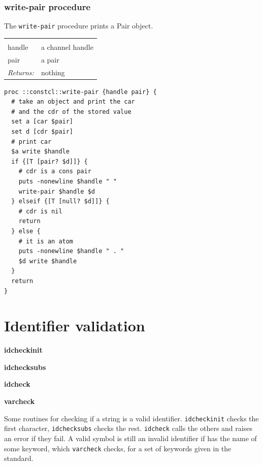 \documentclass[twoside,9pt]{report}
\begin{document}
\subsection{write-pair procedure}
\label{write-pair-procedure}


The \texttt{write-pair} procedure prints a Pair object.

\noindent\begin{tabular}{ |p{1.9cm} p{8cm}| }
\hline
\rowcolor[HTML]{CCCCCC} \multicolumn{2}{|l|}{\bf write-pair (internal)} \\
handle & a channel handle \\
pair & a pair \\
\textit{Returns:} & nothing \\
\hline
\end{tabular}
\begin{lstlisting}
proc ::constcl::write-pair {handle pair} {
  # take an object and print the car
  # and the cdr of the stored value
  set a [car $pair]
  set d [cdr $pair]
  # print car
  $a write $handle
  if {[T [pair? $d]]} {
    # cdr is a cons pair
    puts -nonewline $handle " "
    write-pair $handle $d
  } elseif {[T [null? $d]]} {
    # cdr is nil
    return
  } else {
    # it is an atom
    puts -nonewline $handle " . "
    $d write $handle
  }
  return
}
\end{lstlisting}
\chapter{Identifier validation}
\label{identifier-validation}


\textbf{idcheckinit}


\textbf{idchecksubs}


\textbf{idcheck}


\textbf{varcheck}


Some routines for checking if a string is a valid identifier. \texttt{idcheckinit} checks the first character, \texttt{idchecksubs} checks the rest. \texttt{idcheck} calls the others and raises an error if they fail. A valid symbol is still an invalid identifier if has the name of some keyword, which \texttt{varcheck} checks, for a set of keywords given in the standard.
\end{document}
